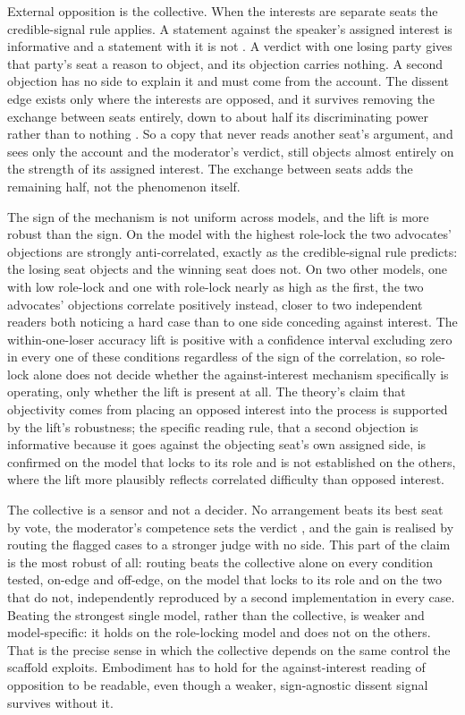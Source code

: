 External opposition is the collective. When the interests are separate
seats the credible-signal rule applies. A statement against the speaker's
assigned interest is informative and a statement with it is not
\citep{milgrom1986relying,lipman1995robust,glazer2001debates}. A verdict
with one losing party gives that party's seat a reason to object, and its
objection carries nothing. A second objection has no side to explain it
and must come from the account. The dissent edge exists only where the
interests are opposed, and it survives removing the exchange between
seats entirely, down to about half its discriminating power rather than
to nothing
\citep{dewatripont1999advocates,krishna2001model}.
So a copy that never reads another seat's argument, and sees only the
account and the moderator's verdict, still objects almost entirely on the
strength of its assigned interest. The exchange between seats adds the
remaining half, not the phenomenon itself.

The sign of the mechanism is not uniform across models, and the lift is
more robust than the sign. On the model with the highest role-lock the two
advocates' objections are strongly anti-correlated, exactly as the
credible-signal rule predicts: the losing seat objects and the winning
seat does not. On two other models, one with low role-lock and one with
role-lock nearly as high as the first, the two advocates' objections
correlate positively instead, closer to two independent readers both
noticing a hard case than to one side conceding against interest.
The within-one-loser accuracy lift is positive with a confidence interval
excluding zero in every one of these conditions regardless of the sign of
the correlation, so role-lock alone does not decide whether the
against-interest mechanism specifically is operating, only whether the
lift is present at all. The theory's claim that objectivity comes from
placing an opposed interest into the process is supported by the lift's
robustness; the specific reading rule, that a second objection is
informative because it goes against the objecting seat's own assigned
side, is confirmed on the model that locks to its role and is not
established on the others, where the lift more plausibly reflects
correlated difficulty than opposed interest.

The collective is a sensor and not a decider. No arrangement beats its best
seat by vote, the moderator's competence sets the verdict
\citep{shin1998adversarial},
and the gain is realised by routing the flagged cases to a stronger judge
with no side. This part of the claim is the most robust of all: routing
beats the collective alone on every condition tested, on-edge and
off-edge, on the model that locks to its role and on the two that do not,
independently reproduced by a second implementation in every case.
Beating the strongest single model, rather than the collective, is
weaker and model-specific: it holds on the role-locking model and does
not on the others.
That is the precise sense in which the collective depends on the same
control the scaffold exploits. Embodiment has to hold for the
against-interest reading of opposition to be readable, even though a
weaker, sign-agnostic dissent signal survives without it.

